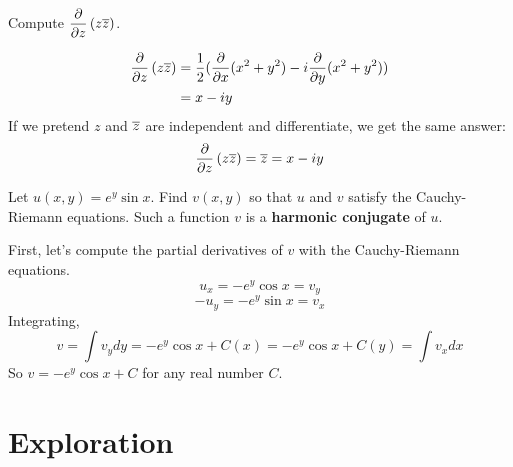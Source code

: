 \documentclass{homework}
\begin{document}
                       \begin{problem}
                       Compute $\displaystyle\frac{\partial}{\partial z} \left( z \overline{z} \right)$.
                       \end{problem}
                       \begin{solution}
                       \begin{align*}
                       \frac{\partial }{\partial z} \left( z \overline{z} \right) &= \frac{1}{2}(\frac{\partial }{\partial x}(x^2+y^2) - i\frac{\partial }{\partial y}(x^2+y^2))\\
                       &= x - iy\\
                       \end{align*}
                       If we pretend $z$ and $\overline{z}$ are independent and differentiate, we get the same answer:
                       \begin{align*}
                       \frac{\partial }{\partial z} \left( z \overline{z} \right) &= \overline{z} = x - iy\\
                       \end{align*}
                       \end{solution}

                       \begin{problem}\label{harmonic-conjugate}
                       Let $u(x,y) = e^y \sin x$.  Find $v(x,y)$ so that $u$ and $v$ satisfy the Cauchy-Riemann equations.  Such a function $v$ is a
                         \textbf{harmonic conjugate} of $u$.
                         \end{problem}
                         \begin{solution}
                         First, let's compute the partial derivatives of $v$ with the Cauchy-Riemann equations.
                         \[u_x = -e^y\cos{x} = v_y\]
                         \[-u_y = -e^y\sin{x} = v_x\]
                         Integrating, 
                         \[v = \int v_y dy = -e^y\cos{x} + C(x)  = -e^y\cos{x} + C(y) = \int v_x dx\]
                         So $v = -e^y\cos{x} + C$ for any real number $C$.
                         \end{solution}
                         \section{Exploration}
\end{document}
